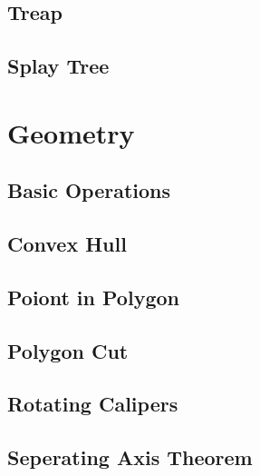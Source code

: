 \documentclass[10pt,landscape,a4paper,twocolumn]{article}
\begin{document}
\subsection{Treap}


\subsection{Splay Tree}



\section{Geometry}
\subsection{Basic Operations}


\subsection{Convex Hull}


\subsection{Poiont in Polygon}


\subsection{Polygon Cut}


\subsection{Rotating Calipers}


\subsection{Seperating Axis Theorem}



% 
\end{document}
